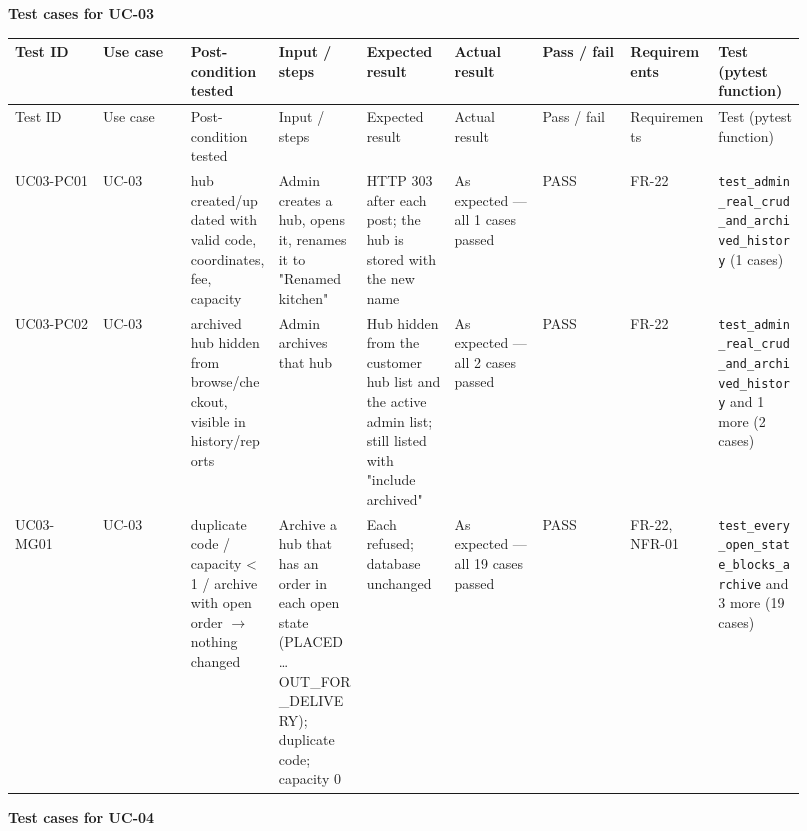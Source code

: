 \textbf{Test cases for UC-03}

\begin{landscape}
\begingroup\footnotesize
\begin{longtable}{>{\raggedright\arraybackslash}p{0.1022\linewidth}>{\raggedright\arraybackslash}p{0.1022\linewidth}>{\raggedright\arraybackslash}p{0.1022\linewidth}>{\raggedright\arraybackslash}p{0.1022\linewidth}>{\raggedright\arraybackslash}p{0.1022\linewidth}>{\raggedright\arraybackslash}p{0.1022\linewidth}>{\raggedright\arraybackslash}p{0.1022\linewidth}>{\raggedright\arraybackslash}p{0.1022\linewidth}>{\raggedright\arraybackslash}p{0.1022\linewidth}}
Test ID & Use case & Post-condition tested & Input / steps & Expected result & Actual result & Pass / fail & Requirements & Test (pytest function) \\
\hline\endfirsthead
Test ID & Use case & Post-condition tested & Input / steps & Expected result & Actual result & Pass / fail & Requirements & Test (pytest function) \\
\hline\endhead
UC03-PC01 & UC-03 & hub created/updated with valid code, coordinates, fee, capacity & Admin creates a hub, opens it, renames it to "Renamed kitchen" & HTTP 303 after each post; the hub is stored with the new name & As expected --- all 1 cases passed & PASS & FR-22 & \texttt{test\_\allowbreak{}admin\_\allowbreak{}real\_\allowbreak{}crud\_\allowbreak{}and\_\allowbreak{}archived\_\allowbreak{}history} (1 cases) \\
UC03-PC02 & UC-03 & archived hub hidden from browse/checkout, visible in history/reports & Admin archives that hub & Hub hidden from the customer hub list and the active admin list; still listed with "include archived" & As expected --- all 2 cases passed & PASS & FR-22 & \texttt{test\_\allowbreak{}admin\_\allowbreak{}real\_\allowbreak{}crud\_\allowbreak{}and\_\allowbreak{}archived\_\allowbreak{}history} and 1 more (2 cases) \\
UC03-MG01 & UC-03 & duplicate code / capacity \textless{} 1 / archive with open order \ensuremath{\rightarrow} nothing changed & Archive a hub that has an order in each open state (PLACED \ldots{} OUT\_FOR\_DELIVERY); duplicate code; capacity 0 & Each refused; database unchanged & As expected --- all 19 cases passed & PASS & FR-22, NFR-01 & \texttt{test\_\allowbreak{}every\_\allowbreak{}open\_\allowbreak{}state\_\allowbreak{}blocks\_\allowbreak{}archive} and 3 more (19 cases) \\
\end{longtable}
\endgroup
\end{landscape}
\textbf{Test cases for UC-04}

